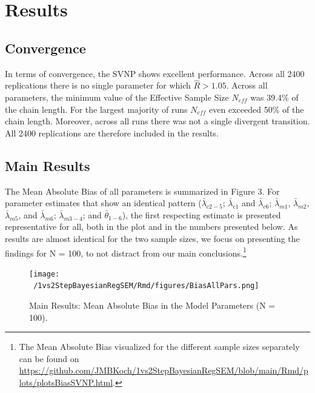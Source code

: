 \documentclass[
  man,floatsintext]{apa6}
\begin{document}
\hypertarget{results}{%
\section{Results}\label{results}}

\hypertarget{convergence}{%
\subsection{Convergence}\label{convergence}}

In terms of convergence, the SVNP shows excellent performance. Across all 2400 replications there is no single parameter for which \(\hat{R} > 1.05\). Across all parameters, the minimum value of the Effective Sample Size \(N_{eff}\) was 39.4\% of the chain length. For the largest majority of runs \(N_{eff}\) even exceeded 50\% of the chain length. Moreover, across all runs there was not a single divergent transition. All 2400 replications are therefore included in the results.

\hypertarget{main-results}{%
\subsection{Main Results}\label{main-results}}

The Mean Absolute Bias of all parameters is summarized in Figure 3. For parameter estimates that show an identical pattern (\(\bar{\lambda}_{c 2-5}\); \(\bar{\lambda}_{c 1}\) and \(\bar{\lambda}_{c 6}\); \(\bar{\lambda}_{m 1}\), \(\bar{\lambda}_{m 2}\), \(\bar{\lambda}_{m 5}\), and \(\bar{\lambda}_{m 6}\); \(\bar{\lambda}_{m 3-4}\); and \(\bar{\theta}_{1-6}\)), the first respecting estimate is presented representative for all, both in the plot and in the numbers presented below. As results are almost identical for the two sample sizes, we focus on presenting the findings for N = 100, to not distract from our main conclusions.\footnote{The Mean Absolute Bias visualized for the different sample sizes separately can be found on \url{https://github.com/JMBKoch/1vs2StepBayesianRegSEM/blob/main/Rmd/plots/plotsBiasSVNP.html}.}

\begin{figure}
\centering
\texttt{[image: ~/1vs2StepBayesianRegSEM/Rmd/figures/BiasAllPars.png]}
\caption{Main Results: Mean Absolute Bias in the Model Parameters (N = 100).}
\end{figure}
\end{document}
